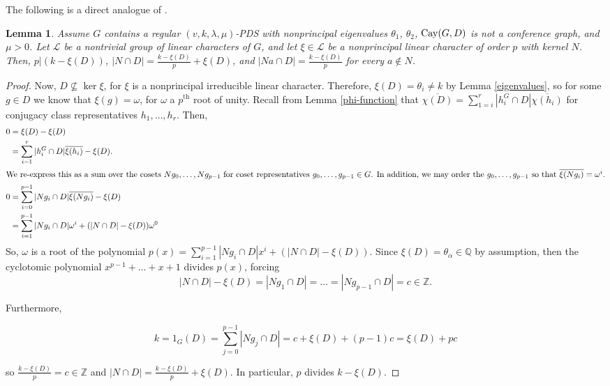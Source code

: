 \documentclass[12pt]{amsproc} %
\newtheorem{lem}[thm]{Lemma}
\theoremstyle{definition}\newtheorem{defn}[thm]{Definition}
\theoremstyle{definition}\newtheorem{rem}[thm]{Remark}
\theoremstyle{definition}\newtheorem{ex}[thm]{Example}
\newcommand{\Cay}{{\rm Cay}}
\newcommand{\Q}{\mathbb{Q}}
\newcommand{\Z}{\mathbb{Z}}
\begin{document}
The following is a direct analogue of \cite[Lemma 2.3]{ott}.

	\begin{lem}\label{kernel-D}
		Assume $G$ contains a regular $(v, k, \lambda, \mu)$-PDS with nonprincipal eigenvalues $\theta_1$, $\theta_2$, $\Cay(G, D)$ is not a conference graph, and $\mu > 0$. Let $\mathcal{L}$ be a nontrivial group of linear characters of $G$, and let $\xi\in \mathcal{L}$ be a nonprincipal linear character of order $p$ with kernel $N$. Then, $p | (k-\xi(D))$, $|N\cap D| = \frac{k-\xi(D)}{p} + \xi(D)$, and $|Na \cap D| = \frac{k-\xi(D)}{p}$ for every $a \not \in N$.
	\end{lem}
		\begin{proof}
		Now, $D\not\subseteq\ker\xi$, for $\xi$ is a nonprincipal irreducible linear character. Therefore, $\xi(D) = \theta_i \neq k$ by Lemma \ref{eigenvalues}, so for some $g\in D$ we know that $\xi(g) = \omega$, for $\omega$ a $p^\text{th}$ root of unity. Recall from Lemma \ref{phi-function} that $\overline{\chi(D)} = \sum_{1 = i}^r|h_i^G\cap D|\overline{\chi( h_i)}$ for conjugacy class representatives $h_1, \dots, h_r$. Then,
			\begin{align*}
				0 &= \xi(D) - \xi(D)\\
				  &= \sum_{i=1}^r |h_i^G\cap D|\overline{\xi(h_i)} - \xi(D).\\
				\intertext{We re-express this as a sum over the cosets $Ng_0, \dots, Ng_{p-1}$ for coset representatives $g_0, \dots, g_{p-1} \in G$. In addition, we may order the $g_0, \dots, g_{p-1}$ so that $\overline{\xi(Ng_i)} = \omega^i$.}
				0 &= \sum_{i=0}^{p-1}|Ng_i\cap D|\overline{\xi(Ng_i)} - \xi(D)\\
				  &=\sum_{i=1}^{p-1}|Ng_i\cap D|\omega^i + (|N\cap D| - \xi(D))\omega^0
			\end{align*}
		So, $\omega$ is a root of the polynomial $p(x) = \sum_{i=1}^{p-1}|Ng_i\cap D|x^i + (|N\cap D| - \xi(D))$. Since $\xi(D) = \theta_\alpha \in \Q$ by assumption, then the cyclotomic polynomial $x^{p-1} + \dots + x + 1$ divides $p(x)$, forcing
			\begin{equation*}
				|N\cap D| - \xi(D) = |Ng_1\cap D|  = \dots = |Ng_{p-1}\cap D| = c\in \Z.
			\end{equation*}
			
		Furthermore, 
			
			\begin{equation*}
				k = 1_G(D) = \sum_{j=0}^{p-1}|Ng_j\cap D| = c+\xi(D) + (p-1)c = \xi(D) + pc
			\end{equation*}
			
		so $\frac{k-\xi(D)}{p} = c\in \Z$ and $|N\cap D| = \frac{k-\xi(D)}{p} + \xi(D)$. In particular, $p$ divides $k-\xi(D)$.
		\end{proof}
\end{document}
